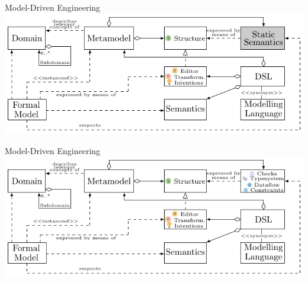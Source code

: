 	\begin{frame}{Model-Driven Engineering}
		\includegraphics[width=\textwidth]{tikz/mdsd_concept_5.pdf}
	\end{frame}
	
	\begin{frame}[noframenumbering]{Model-Driven Engineering}
		\includegraphics[width=\textwidth]{tikz/mdsd_concept_6.pdf}
	\end{frame}
		
